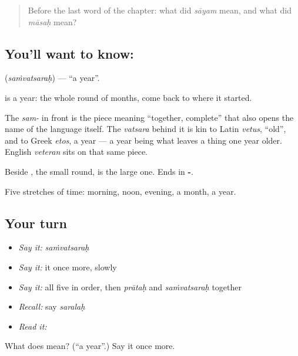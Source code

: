 \label{lesson:SA-C45-year}



\begin{quote}
Before the last word of the chapter: what did \emph{sāyam} mean, and what did \emph{māsaḥ} mean?
\end{quote}

\subsection*{You'll want to know: }
\textbf{} (\emph{saṁvatsaraḥ}) — \textquotedblleft{}a year\textquotedblright{}.

\textbf{} is a year: the whole round of months, come back to where it started.

The \emph{sam-} in front is the piece meaning \textquotedblleft{}together, complete\textquotedblright{} that also opens the name of the language itself. The \emph{vatsara} behind it is kin to Latin \emph{vetus}, \textquotedblleft{}old\textquotedblright{}, and to Greek \emph{etos}, a year — a year being what leaves a thing one year older. English \emph{veteran} sits on that same piece.

Beside , the small round, \textbf{} is the large one. Ends in \textbf{-}.

\begin{grammarlens}[title={What you've built}]
Five stretches of time: morning, noon, evening, a month, a year.
\end{grammarlens}

\subsection*{Your turn}
\begin{itemize}
\raggedright
  \item \emph{Say it:} \emph{saṁvatsaraḥ}
  \item \emph{Say it:} it once more, slowly
  \item \emph{Say it:} all five in order, then \emph{prātaḥ} and \emph{saṁvatsaraḥ} together
  \item \emph{Recall:} say \emph{saralaḥ}
  \item \emph{Read it:} \textbf{}
\end{itemize}

\begin{tcolorbox}[breakable,colback=teal!4,colframe=teal!35!black,title={Before you move on}]
What does  mean? (\textquotedblleft{}a year\textquotedblright{}.) Say it once more.
\end{tcolorbox}
